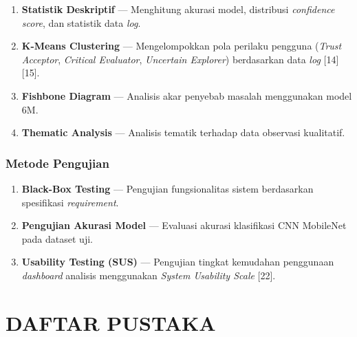 \documentclass[10pt,twoside,openright]{report}
\begin{document}
\begin{enumerate}
    \item \textbf{Statistik Deskriptif} --- Menghitung akurasi model, distribusi \textit{confidence score}, dan statistik data \textit{log}.
    \item \textbf{K-Means Clustering} --- Mengelompokkan pola perilaku pengguna (\textit{Trust Acceptor}, \textit{Critical Evaluator}, \textit{Uncertain Explorer}) berdasarkan data \textit{log} [14][15].
    \item \textbf{Fishbone Diagram} --- Analisis akar penyebab masalah menggunakan model 6M.
    \item \textbf{Thematic Analysis} --- Analisis tematik terhadap data observasi kualitatif.
\end{enumerate}

\subsection{Metode Pengujian}
\label{subsec:metode-pengujian}

\begin{enumerate}
    \item \textbf{Black-Box Testing} --- Pengujian fungsionalitas sistem berdasarkan spesifikasi \textit{requirement}.
    \item \textbf{Pengujian Akurasi Model} --- Evaluasi akurasi klasifikasi CNN MobileNet pada dataset uji.
    \item \textbf{Usability Testing (SUS)} --- Pengujian tingkat kemudahan penggunaan \textit{dashboard} analisis menggunakan \textit{System Usability Scale} [22].
\end{enumerate}


\chapter*{DAFTAR PUSTAKA}
\end{document}
